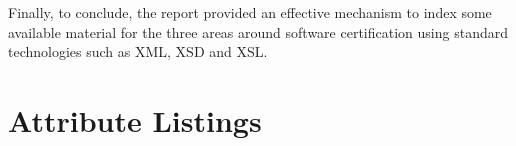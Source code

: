 \documentclass[11pt,letterpaper]{report}
\begin{document}
Finally, to conclude, the report provided an effective mechanism to index some available material for the three areas around software certification using standard technologies such as XML, XSD and XSL.

\appendix
\chapter{Attribute Listings}


 

 

  



\end{document}
